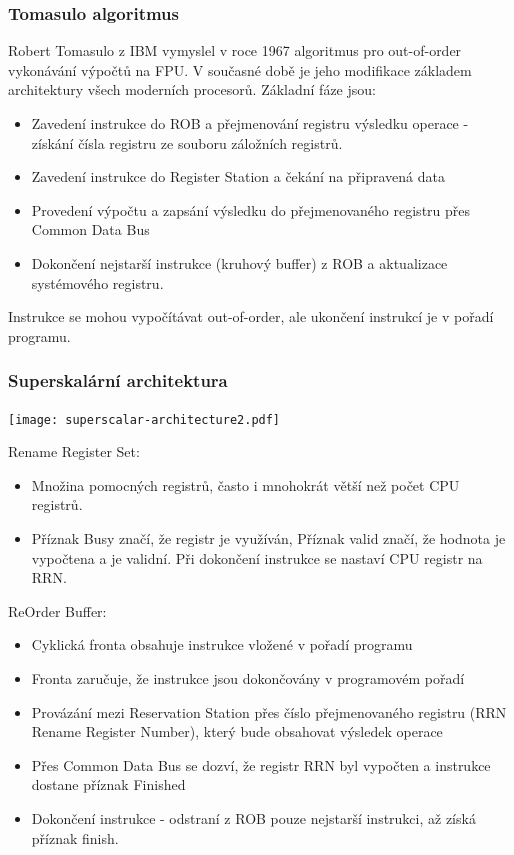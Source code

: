 \documentclass{beamer}
\begin{document}
\begin{frame}
\frametitle{Tomasulo algoritmus}

Robert Tomasulo z IBM vymyslel v roce 1967 algoritmus pro out-of-order vykonávání výpočtů na FPU.
V současné době je jeho modifikace základem architektury všech moderních procesorů.
Základní fáze jsou:
\begin{itemize}
\item Zavedení instrukce do ROB a přejmenování registru výsledku operace - získání čísla registru ze souboru záložních registrů. 
\item Zavedení instrukce do Register Station a čekání na připravená data
\item Provedení výpočtu a zapsání výsledku do přejmenovaného registru přes Common Data Bus
\item Dokončení nejstarší instrukce (kruhový buffer) z ROB a aktualizace systémového registru.
\end{itemize}
Instrukce se mohou vypočítávat out-of-order, ale ukončení instrukcí je v pořadí programu.
\end{frame}

\begin{frame}
\frametitle{Superskalární architektura}

\begin{center}
\texttt{[image: superscalar-architecture2.pdf]}
\end{center}

\scriptsize
Rename Register Set:
\begin{itemize}
\item Množina pomocných registrů, často i mnohokrát větší než počet CPU registrů.
\item Příznak Busy značí, že registr je využíván, Příznak valid značí, že hodnota je vypočtena a je validní. Při dokončení instrukce se nastaví CPU registr na RRN.
\end{itemize}

ReOrder Buffer:
\begin{itemize}
\item Cyklická fronta obsahuje instrukce vložené v pořadí programu
\item Fronta zaručuje, že instrukce jsou dokončovány v programovém pořadí
\item Provázání mezi Reservation Station přes číslo přejmenovaného registru (RRN Rename Register Number), který bude obsahovat výsledek operace
\item Přes Common Data Bus se dozví, že registr RRN byl vypočten a instrukce dostane příznak Finished
\item Dokončení instrukce - odstraní z ROB pouze nejstarší instrukci, až získá příznak finish.
\end{itemize}


\end{frame}
\end{document}
